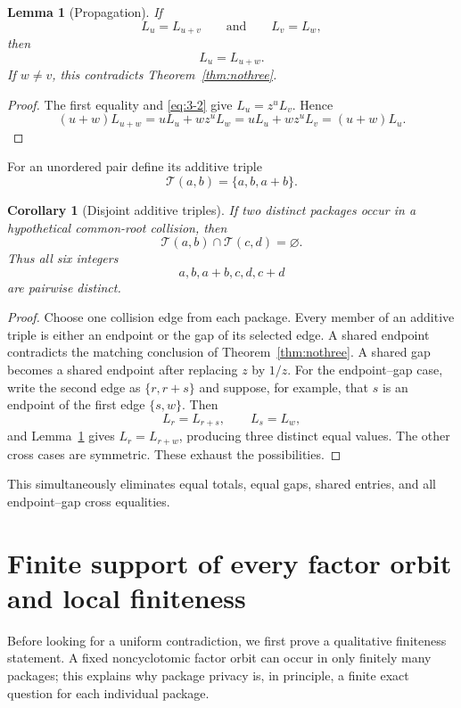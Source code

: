 \documentclass[11pt]{article}
\numberwithin{equation}{section}
\newtheorem{lemma}[theorem]{Lemma}
\newtheorem{corollary}[theorem]{Corollary}
\theoremstyle{definition}
\newcommand{\T}{\mathcal T}
\begin{document}
\begin{lemma}[Propagation]\label{lem:propagation}
If
\[
 L_u=L_{u+v}
 \qquad\text{and}\qquad
 L_v=L_w,
\]
then
\[
 L_u=L_{u+w}.
\]
If \(w\neq v\), this contradicts Theorem~\ref{thm:nothree}.
\end{lemma}

\begin{proof}
The first equality and \eqref{eq:3-2} give \(L_u=z^uL_v\).  Hence
\[
 (u+w)L_{u+w}=uL_u+wz^uL_w
 =uL_u+wz^uL_v=(u+w)L_u.
\]
\end{proof}

For an unordered pair define its additive triple
\[
 \T(a,b)=\{a,b,a+b\}.
\]

\begin{corollary}[Disjoint additive triples]\label{cor:triples}
If two distinct packages occur in a hypothetical common-root collision, then
\begin{equation}
 \T(a,b)\cap\T(c,d)=\varnothing.
 \label{eq:3-3}
\end{equation}
Thus all six integers
\[
 a,b,a+b,c,d,c+d
\]
are pairwise distinct.
\end{corollary}

\begin{proof}
Choose one collision edge from each package.  Every member of an additive
triple is either an endpoint or the gap of its selected edge.  A shared
endpoint contradicts the matching conclusion of Theorem~\ref{thm:nothree}.
A shared gap becomes a shared endpoint after replacing \(z\) by \(1/z\).
For the endpoint--gap case, write the second edge as
\(\{r,r+s\}\) and suppose, for example, that \(s\) is an endpoint of
the first edge \(\{s,w\}\).  Then
\[
 L_r=L_{r+s},\qquad L_s=L_w,
\]
and Lemma~\ref{lem:propagation} gives \(L_r=L_{r+w}\), producing three
distinct equal values.  The other cross cases are symmetric.  These exhaust
the possibilities.
\end{proof}

This simultaneously eliminates equal totals, equal gaps, shared entries, and
all endpoint--gap cross equalities.

\section{Finite support of every factor orbit and local finiteness}
\label{sec:finite-support}

Before looking for a uniform contradiction, we first prove a qualitative finiteness statement.  A fixed noncyclotomic factor orbit can occur in only finitely many packages; this explains why package privacy is, in principle, a finite exact question for each individual package.
\end{document}
